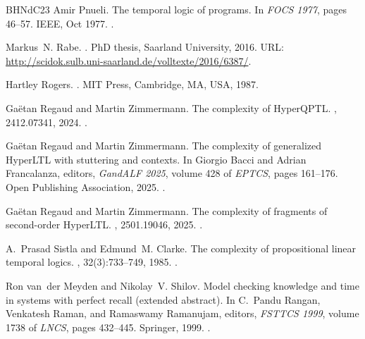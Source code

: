 \documentclass[dvipsnames,10pt,a4paper]{amsart}
\theoremstyle{definition}
\theoremstyle{remark}
\begin{document}
\begin{thebibliography}{BHNdC23}
Amir Pnueli.
\newblock The temporal logic of programs.
\newblock In {\em FOCS 1977}, pages 46--57. IEEE, Oct 1977.
\newblock \href {https://doi.org/10.1109/SFCS.1977.32}
  {}.

Markus~N. Rabe.
.
\newblock PhD thesis, Saarland University, 2016.
\newblock URL: \url{http://scidok.sulb.uni-saarland.de/volltexte/2016/6387/}.

Hartley Rogers.
.
\newblock MIT Press, Cambridge, MA, USA, 1987.

Gaëtan Regaud and Martin Zimmermann.
\newblock The complexity of {HyperQPTL}.
, 2412.07341, 2024.
\newblock \href {https://doi.org/10.48550/ARXIV.2412.07341}
  {}.

Ga\"etan Regaud and Martin Zimmermann.
\newblock The complexity of generalized {HyperLTL} with stuttering and
  contexts.
\newblock In Giorgio Bacci and Adrian Francalanza, editors, {\em GandALF 2025},
  volume 428 of {\em EPTCS}, pages 161--176. Open Publishing Association, 2025.
\newblock \href {https://doi.org/10.4204/EPTCS.428.12}
  {}.

Gaëtan Regaud and Martin Zimmermann.
\newblock The complexity of fragments of second-order {HyperLTL}.
, 2501.19046, 2025.
\newblock \href {https://doi.org/10.48550/ARXIV.2501.19046}
  {}.

A.~Prasad Sistla and Edmund~M. Clarke.
\newblock The complexity of propositional linear temporal logics.
, 32(3):733--749, 1985.
\newblock \href {https://doi.org/10.1145/3828.3837}
  {}.

Ron van~der Meyden and Nikolay~V. Shilov.
\newblock Model checking knowledge and time in systems with perfect recall
  (extended abstract).
\newblock In C.~Pandu Rangan, Venkatesh Raman, and Ramaswamy Ramanujam,
  editors, {\em FSTTCS 1999}, volume 1738 of {\em LNCS}, pages 432--445.
  Springer, 1999.
\newblock \href {https://doi.org/10.1007/3-540-46691-6\_35}
  {}.

\end{thebibliography}
\end{document}
